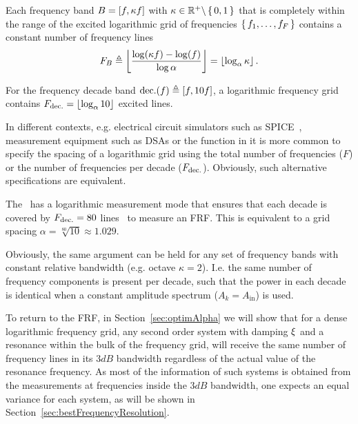   \begin{property}
   Each frequency band $B = \left[ f, \kappa f \right]$ with $\kappa \in \mathbb{R}^{+} \backslash \set{0,1}$ that is completely within the range of the excited logarithmic grid of frequencies $\set{f_1, \ldots, f_F}$ contains a constant number of frequency lines
   \begin{equation}
     F_{B} \triangleq
     \left\lfloor \frac{\log (\kappa f) - \log( f )}{\log \alpha} \right\rfloor
         = \left\lfloor \log_{\alpha} \kappa \right\rfloor
         \text{.}
   \end{equation}
   \end{property}
  \begin{example}
    For the frequency decade band $\mathrm{dec.}(f) \triangleq \left[ f, 10 f \right]$, a logarithmic frequency grid contains $F_{\mathrm{dec.}} = \left\lfloor \log_{\alpha} 10 \right\rfloor$ excited lines.
  \end{example}
  \begin{remark}
    In different contexts, e.g. electrical circuit simulators such as \gls{SPICE}~\citep{Kundert1995}, measurement equipment such as \glspl{DSA} or the  function in \MATLAB it is more common to specify the spacing of a logarithmic grid using the total number of frequencies ($F$) or the number of frequencies per decade ($F_{\mathrm{dec.}}$).
    Obviously, such alternative specifications are equivalent.
  \end{remark}
  \begin{example}
    The~\citet{HP3562A} has a logarithmic measurement mode that ensures that each decade is covered by $F_{\mathrm{dec.}} = 80$ lines~ to measure an \gls{FRF}.
    This is equivalent to a grid spacing $\alpha = \sqrt[80]{10} \approx 1.029$.
  \end{example}

   Obviously, the same argument can be held for any set of frequency bands with constant relative bandwidth (e.g. octave $\kappa = 2$).
   I.e. the same number of frequency components is present per decade, such that the power in each decade is identical when a constant amplitude spectrum ($A_k = A_{\mathrm{in}}$) is used.   

  To return to the FRF, in Section~\ref{sec:optimAlpha} we will show that for a dense logarithmic frequency grid, any second order system with damping $\xi$ and a resonance within the bulk of the frequency grid, will receive the same number of frequency lines in its $3 \unit{dB}$ bandwidth regardless of the actual value of the resonance frequency.
  As most of the information of such systems is obtained from the measurements at frequencies inside the $3 \unit{dB}$
  bandwidth, one expects an equal variance for each system, as will be shown in Section~\ref{sec:bestFrequencyResolution}.
  
